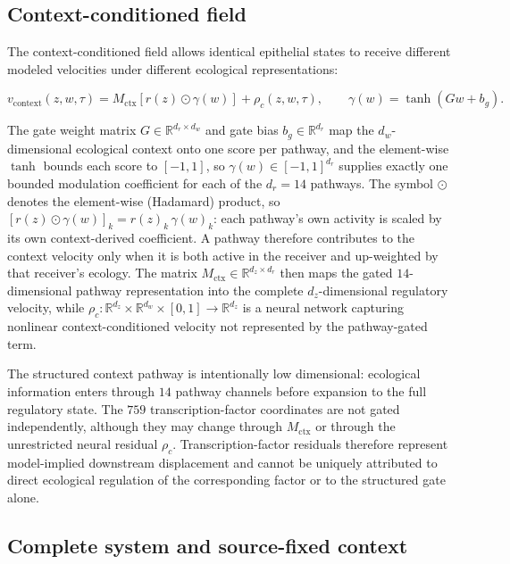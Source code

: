 \subsection{Context-conditioned field}
\label{sec:methods-context-field}

The context-conditioned field allows identical epithelial states to receive different modeled velocities under different ecological representations:

\begin{equation}
v_{\mathrm{context}}(z,w,\tau)
=
M_{\mathrm{ctx}}
\left[
r(z)
\odot
\gamma(w)
\right]
+
\rho_c(z,w,\tau),
\qquad
\gamma(w)
=
\tanh(Gw+b_g).
\label{eq:methods-context-field}
\end{equation}

The gate weight matrix \(G\in\mathbb{R}^{d_r\times d_w}\) and gate bias
\(b_g\in\mathbb{R}^{d_r}\) map the \(d_w\)-dimensional ecological context onto
one score per pathway, and the element-wise \(\tanh\) bounds each score to
\([-1,1]\), so
\(\gamma(w)\in[-1,1]^{d_r}\) supplies exactly one bounded modulation
coefficient for each of the \(d_r=14\) pathways. The symbol \(\odot\) denotes
the element-wise (Hadamard) product, so
\(\left[r(z)\odot\gamma(w)\right]_k=r(z)_k\,\gamma(w)_k\): each pathway's own
activity is scaled by its own context-derived coefficient. A pathway therefore
contributes to the context velocity only when it is both active in the receiver
and up-weighted by that receiver's ecology.
The matrix \(M_{\mathrm{ctx}}\in\mathbb{R}^{d_z\times d_r}\) then maps the gated
\(14\)-dimensional pathway representation into the complete
\(d_z\)-dimensional regulatory velocity, while
\(\rho_c:\mathbb{R}^{d_z}\times\mathbb{R}^{d_w}\times[0,1]\rightarrow\mathbb{R}^{d_z}\)
is a neural network capturing nonlinear context-conditioned velocity not
represented by the pathway-gated term.

The structured context pathway is intentionally low dimensional: ecological information enters through \(14\) pathway channels before expansion to the full regulatory state. The \(759\) transcription-factor coordinates are not gated independently, although they may change through \(M_{\mathrm{ctx}}\) or through the unrestricted neural residual \(\rho_c\). Transcription-factor residuals therefore represent model-implied downstream displacement and cannot be uniquely attributed to direct ecological regulation of the corresponding factor or to the structured gate alone.

\subsection{Complete system and source-fixed context}
\label{sec:methods-source-context}
\label{sec:methods-complete-field}

